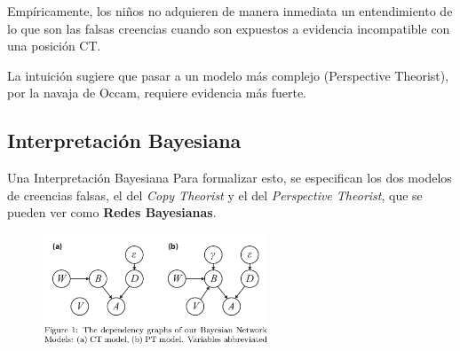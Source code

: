 \documentclass{beamer}
\begin{document}
\begin{frame}

Empíricamente, los niños no adquieren de manera inmediata un entendimiento de lo que son las falsas creencias cuando son expuestos a evidencia incompatible con una posición CT.

La intuición sugiere que pasar a un modelo más complejo (Perspective Theorist), por la navaja de Occam, requiere evidencia más fuerte.
\end{frame}

\subsection{Interpretación Bayesiana}

\begin{frame}[fragile]{Una Interpretación Bayesiana}
Para formalizar esto, se especifican los dos modelos de creencias falsas, el del \textit{Copy Theorist} y el del \textit{Perspective Theorist}, que se pueden ver como \textbf{Redes Bayesianas}.

\begin{figure}[h!]
  \centering
    \includegraphics[width=0.6\textwidth]{imagenes/modelos.jpg}
\end{figure}
\end{frame}
\end{document}
